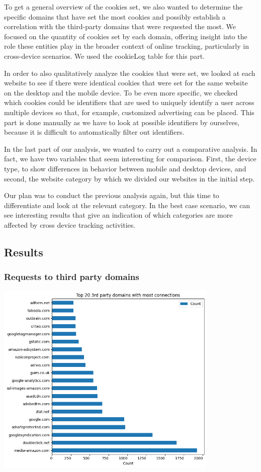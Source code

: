 To get a general overview of the cookies set, we also wanted to determine the specific domains that have set the most cookies and possibly establish a correlation with the third-party domains that were requested the most. We focused on the quantity of cookies set by each domain, offering insight into the role these entities play in the broader context of online tracking, particularly in cross-device scenarios. We used the cookieLog table for this part.

In order to also qualitatively analyze the cookies that were set, we looked at each website to see if there were identical cookies that were set for the same website on the desktop and the mobile device. To be even more specific, we checked which cookies could be identifiers that are used to uniquely identify a user across multiple devices so that, for example, customized advertising can be placed. This part is done manually as we have to look at possible identifiers by ourselves, because it is difficult to automatically filter out identifiers.

In the last part of our analysis, we wanted to carry out a comparative analysis. In fact, we have two variables that seem interesting for comparison. First, the device type, to show differences in behavior between mobile and desktop devices, and second, the website category by which we divided our websites in the initial step.

Our plan was to conduct the previous analysis again, but this time to differentiate and look at the relevant category. In the best case scenario, we can see interesting results that give an indication of which categories are more affected by cross device tracking activities.

\subsection{Results}
\subsubsection{Requests to third party domains}
\includegraphics[width=0.8\textwidth]{./assets/top20thirdpartydomains.png}

